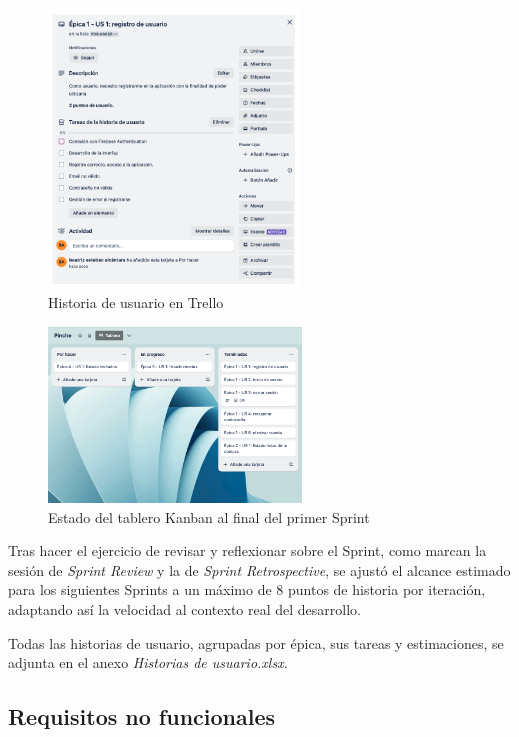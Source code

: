 \begin{figure}[H]
\centering
\includegraphics[width=0.6\textwidth]{./img/requirements/user_story_trello.png}
\caption{Historia de usuario en Trello}
\label{fig:user_story_trello}
\end{figure}

\begin{figure}[H]
\centering
\includegraphics[width=0.6\textwidth]{./img/requirements/final_sprint_trello.png}
\caption{Estado del tablero Kanban al final del primer Sprint}
\label{fig:final_sprint_trello}
\end{figure}

Tras hacer el ejercicio de revisar y reflexionar sobre el Sprint, como marcan la sesión de \textit{Sprint Review} y la de \textit{Sprint Retrospective}, se ajustó el alcance estimado para los siguientes Sprints a un máximo de 8 puntos de historia por iteración, adaptando así la velocidad al contexto real del desarrollo.

Todas las historias de usuario, agrupadas por épica, sus tareas y estimaciones, se adjunta en el anexo \textit{Historias de usuario.xlsx}.

\subsection{Requisitos no funcionales}

